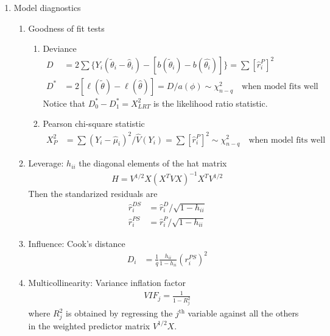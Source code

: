 \message{ !name(biostat651_summary.tex)}\documentclass{amsart}
\begin{document}
\begin{enumerate}
\item Model diagnostics
  \begin{enumerate}
  \item Goodness of fit tests
    \begin{enumerate}
    \item Deviance
      \begin{align*}
        D & = 2 \sum \{ Y_i (\tilde{\theta}_i - \hat{\theta}_i) - [b(\tilde{\theta}_i) - b(\hat{\theta_i})] \} 
            = \sum[\hat{r}^P_i]^2 \\
        D^* & =  2 [ \ell(\tilde{\theta}) - \ell(\hat{\theta})]
              = D / a(\phi)
              \sim \chi^2_{n-q} \quad \text{when model fits well}
      \end{align*}
      Notice that $D^*_0 - D^*_1 = X^2_{LRT}$ is the likelihood ratio
      statistic.
    \item Pearson chi-square statistic
      \begin{align*}
        X^2_P & = \sum (Y_i - \hat{\mu}_i)^2 / \hat{V}(Y_i)
                = \sum[\hat{r}^P_i]^2
                \sim \chi^2_{n-q} \quad \text{when model fits well}
      \end{align*}
    \end{enumerate}

  \item Leverage: $h_{ii}$ the diagonal elements of the hat matrix
    \begin{align*}
      H = V^{1/2} X(X^T V X)^{-1} X^T V^{1/2}
    \end{align*}
    Then the standarized residuals are
    \begin{align*}
      \hat{r}^{DS}_i & = \hat{r}^D_i / \sqrt{1-h_{ii}} \\
      \hat{r}^{PS}_i & = \hat{r}^P_i / \sqrt{1-h_{ii}} 
    \end{align*}

  \item Influence: Cook's distance
    \begin{align*}
      D_i & = \frac{1}{q} \frac{h_{ii}}{1-h_{ii}}(r^{PS}_i)^2
    \end{align*}
    
  \item Multicollinearity: Variance inflation factor
    \begin{align*}
      VIF_j = \frac{1}{1-R^2_j}
    \end{align*}
    where $R^2_j$ is obtained by regressing the $j^\text{th}$ variable
    against all the others in the weighted predictor matrix
    $V^{1/2}X$.
  \end{enumerate}

    

  
\end{enumerate}
\end{document}
